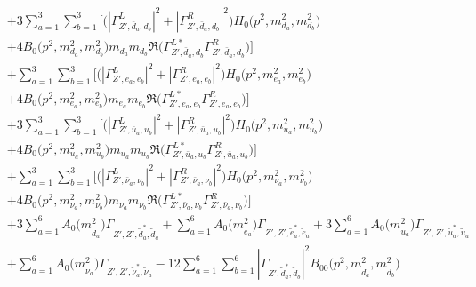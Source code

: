 \begin{itemize}
\begin{align}
 &+3 \sum_{a=1}^{3}\sum_{b=1}^{3} \Big[\Big(|{\Gamma^L_{{Z'},\bar{d}_{{a}},d_{{b}}}}|^2 + |{\Gamma^R_{{Z'},\bar{d}_{{a}},d_{{b}}}}|^2\Big){H_0\Big(p^{2},m^2_{d_{{a}}},m^2_{d_{{b}}}\Big)} \nonumber \\ & +4 {B_0\Big(p^{2},m^2_{d_{{a}}},m^2_{d_{{b}}}\Big)} m_{d_{{a}}} m_{d_{{b}}} {\Re\Big({\Gamma^{L*}_{{Z'},\bar{d}_{{a}},d_{{b}}}} {\Gamma^R_{{Z'},\bar{d}_{{a}},d_{{b}}}} \Big)} \Big] \nonumber \\ 
 &+\sum_{a=1}^{3}\sum_{b=1}^{3} \Big[\Big(|{\Gamma^L_{{Z'},\bar{e}_{{a}},e_{{b}}}}|^2 + |{\Gamma^R_{{Z'},\bar{e}_{{a}},e_{{b}}}}|^2\Big){H_0\Big(p^{2},m^2_{e_{{a}}},m^2_{e_{{b}}}\Big)} \nonumber \\ & +4 {B_0\Big(p^{2},m^2_{e_{{a}}},m^2_{e_{{b}}}\Big)} m_{e_{{a}}} m_{e_{{b}}} {\Re\Big({\Gamma^{L*}_{{Z'},\bar{e}_{{a}},e_{{b}}}} {\Gamma^R_{{Z'},\bar{e}_{{a}},e_{{b}}}} \Big)} \Big]\nonumber \\ 
 &+3 \sum_{a=1}^{3}\sum_{b=1}^{3} \Big[\Big(|{\Gamma^L_{{Z'},\bar{u}_{{a}},u_{{b}}}}|^2 + |{\Gamma^R_{{Z'},\bar{u}_{{a}},u_{{b}}}}|^2\Big){H_0\Big(p^{2},m^2_{u_{{a}}},m^2_{u_{{b}}}\Big)} \nonumber \\ & +4 {B_0\Big(p^{2},m^2_{u_{{a}}},m^2_{u_{{b}}}\Big)} m_{u_{{a}}} m_{u_{{b}}} {\Re\Big({\Gamma^{L*}_{{Z'},\bar{u}_{{a}},u_{{b}}}} {\Gamma^R_{{Z'},\bar{u}_{{a}},u_{{b}}}} \Big)} \Big] \nonumber \\ 
 &+\sum_{a=1}^{3}\sum_{b=1}^{3} \Big[\Big(|{\Gamma^L_{{Z'},\bar{\nu}_{{a}},\nu_{{b}}}}|^2 + |{\Gamma^R_{{Z'},\bar{\nu}_{{a}},\nu_{{b}}}}|^2\Big){H_0\Big(p^{2},m^2_{\nu_{{a}}},m^2_{\nu_{{b}}}\Big)} \nonumber \\ & +4 {B_0\Big(p^{2},m^2_{\nu_{{a}}},m^2_{\nu_{{b}}}\Big)} m_{\nu_{{a}}} m_{\nu_{{b}}} {\Re\Big({\Gamma^{L*}_{{Z'},\bar{\nu}_{{a}},\nu_{{b}}}} {\Gamma^R_{{Z'},\bar{\nu}_{{a}},\nu_{{b}}}} \Big)} \Big]\nonumber \\ 
 &+3 \sum_{a=1}^{6}{A_0\Big(m^2_{\tilde{d}_{{a}}}\Big)} {\Gamma_{{Z'},{Z'},\tilde{d}^*_{{a}},\tilde{d}_{{a}}}}  +\sum_{a=1}^{6}{A_0\Big(m^2_{\tilde{e}_{{a}}}\Big)} {\Gamma_{{Z'},{Z'},\tilde{e}^*_{{a}},\tilde{e}_{{a}}}} +3 \sum_{a=1}^{6}{A_0\Big(m^2_{\tilde{u}_{{a}}}\Big)} {\Gamma_{{Z'},{Z'},\tilde{u}^*_{{a}},\tilde{u}_{{a}}}}  \nonumber \\ 
 &+\sum_{a=1}^{6}{A_0\Big(m^2_{\tilde{\nu}_{{a}}}\Big)} {\Gamma_{{Z'},{Z'},\tilde{\nu}^*_{{a}},\tilde{\nu}_{{a}}}} -12 \sum_{a=1}^{6}\sum_{b=1}^{6}|{\Gamma_{{Z'},\tilde{d}^*_{{a}},\tilde{d}_{{b}}}}|^2 {B_{00}\Big(p^{2},m^2_{\tilde{d}_{{a}}},m^2_{\tilde{d}_{{b}}}\Big)}  \nonumber \\ 

\end{align}
\end{itemize}
